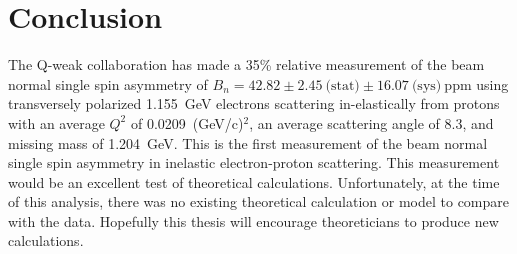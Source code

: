\section{Conclusion}
\label{Conclusion}

The Q-weak collaboration has made a 35\% relative measurement of the beam normal single spin asymmetry of $B_{n} = 42.82\pm2.45~\text{(stat)}\pm16.07~\text{(sys)}~\text{ppm}$ using transversely polarized 1.155~GeV electrons scattering in-elastically from protons with an average $Q^{2}$ of 0.0209~(GeV/c)$^{2}$, an average scattering angle of 8.3\degrees{}, and missing mass of 1.204~GeV. This is the first measurement of the beam normal single spin asymmetry in inelastic electron-proton scattering. This measurement would be an excellent test of theoretical calculations. Unfortunately, at the time of this analysis, there was no existing theoretical calculation or model to compare with the data. Hopefully this thesis will encourage theoreticians to produce new calculations. 

